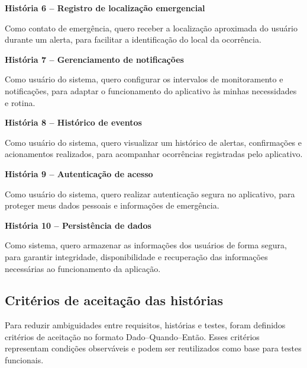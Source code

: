 \textbf{História 6 – Registro de localização emergencial}

Como contato de emergência, quero receber a localização aproximada do usuário durante um alerta, para facilitar a identificação do local da ocorrência.

\bigskip

\textbf{História 7 – Gerenciamento de notificações}

Como usuário do sistema, quero configurar os intervalos de monitoramento e notificações, para adaptar o funcionamento do aplicativo às minhas necessidades e rotina.

\bigskip

\textbf{História 8 – Histórico de eventos}

Como usuário do sistema, quero visualizar um histórico de alertas, confirmações e acionamentos realizados, para acompanhar ocorrências registradas pelo aplicativo.

\bigskip

\textbf{História 9 – Autenticação de acesso}

Como usuário do sistema, quero realizar autenticação segura no aplicativo, para proteger meus dados pessoais e informações de emergência.

\bigskip

\textbf{História 10 – Persistência de dados}

Como sistema, quero armazenar as informações dos usuários de forma segura, para garantir integridade, disponibilidade e recuperação das informações necessárias ao funcionamento da aplicação.


\subsection{Critérios de aceitação das histórias}

Para reduzir ambiguidades entre requisitos, histórias e testes, foram definidos critérios de aceitação no formato Dado--Quando--Então. Esses critérios representam condições observáveis e podem ser reutilizados como base para testes funcionais.

